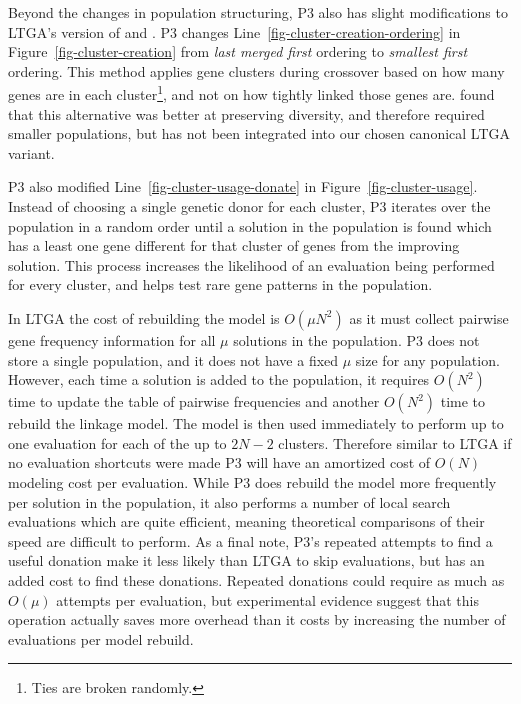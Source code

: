 \documentclass[twoside]{article}
\begin{document}
Beyond the changes in population structuring, P3 also has slight modifications to
LTGA's version of  and .
P3 changes Line~\ref{fig-cluster-creation-ordering} in Figure~\ref{fig-cluster-creation}
from \emph{last merged first} ordering to \emph{smallest first} ordering.
This method applies gene clusters during crossover based on how many genes
are in each cluster\footnote{Ties are broken randomly.}, and not on how tightly linked those genes are.
\cite{goldman:2012:ltga} found that this alternative was better at preserving
diversity, and therefore required smaller populations, but has  not been integrated into
our chosen canonical LTGA variant.

P3 also modified Line~\ref{fig-cluster-usage-donate} in Figure~\ref{fig-cluster-usage}.
Instead of choosing a single genetic donor for each cluster, P3 iterates over the
population in a random order until a solution in the population is found which
has a least one gene different for that cluster of genes from the improving solution.
This process increases the likelihood of an evaluation being performed for every cluster,
and helps test rare gene patterns in the population.

In LTGA the cost of rebuilding the model is $O(\mu N^2)$ as it must collect pairwise
gene frequency information for all $\mu$ solutions in the population. P3 does not store
a single population, and it does not have a fixed $\mu$ size for any population. However,
each time a solution is added to the population, it requires $O(N^2)$ time to update
the table of pairwise frequencies and another $O(N^2)$ time to rebuild the linkage model.
The model is then used immediately to perform up to one evaluation for each of the up
to $2N-2$ clusters. Therefore similar to LTGA if no evaluation shortcuts were made P3
will have an amortized cost of $O(N)$ modeling cost per evaluation. While P3 does
rebuild the model more frequently per solution in the population, it also performs
a number of local search evaluations which are quite efficient, meaning theoretical
comparisons of their speed are difficult to perform. As a final note, P3's repeated
attempts to find a useful donation make it less likely than LTGA to skip evaluations,
but has an added cost to find these donations. Repeated donations could require as much
as $O(\mu)$ attempts per evaluation, but experimental evidence suggest that this
operation actually saves more overhead than it costs by increasing the number of evaluations
per model rebuild.
\end{document}
